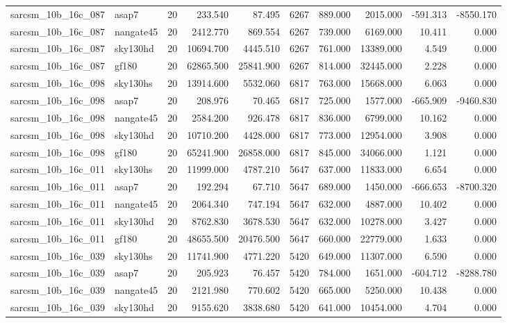 \begin{tabular}{llrrrrrrrr}
sarcsm\_10b\_16c\_087 & asap7 & 20 & 233.540 & 87.495 & 6267 & 889.000 & 2015.000 & -591.313 & -8550.170 \\
sarcsm\_10b\_16c\_087 & nangate45 & 20 & 2412.770 & 869.554 & 6267 & 739.000 & 6169.000 & 10.411 & 0.000 \\
sarcsm\_10b\_16c\_087 & sky130hd & 20 & 10694.700 & 4445.510 & 6267 & 761.000 & 13389.000 & 4.549 & 0.000 \\
sarcsm\_10b\_16c\_087 & gf180 & 20 & 62865.500 & 25841.900 & 6267 & 814.000 & 32445.000 & 2.228 & 0.000 \\
sarcsm\_10b\_16c\_098 & sky130hs & 20 & 13914.600 & 5532.060 & 6817 & 763.000 & 15668.000 & 6.063 & 0.000 \\
sarcsm\_10b\_16c\_098 & asap7 & 20 & 208.976 & 70.465 & 6817 & 725.000 & 1577.000 & -665.909 & -9460.830 \\
sarcsm\_10b\_16c\_098 & nangate45 & 20 & 2584.200 & 926.478 & 6817 & 836.000 & 6799.000 & 10.162 & 0.000 \\
sarcsm\_10b\_16c\_098 & sky130hd & 20 & 10710.200 & 4428.000 & 6817 & 773.000 & 12954.000 & 3.908 & 0.000 \\
sarcsm\_10b\_16c\_098 & gf180 & 20 & 65241.900 & 26858.000 & 6817 & 845.000 & 34066.000 & 1.121 & 0.000 \\
sarcsm\_10b\_16c\_011 & sky130hs & 20 & 11999.000 & 4787.210 & 5647 & 637.000 & 11833.000 & 6.654 & 0.000 \\
sarcsm\_10b\_16c\_011 & asap7 & 20 & 192.294 & 67.710 & 5647 & 689.000 & 1450.000 & -666.653 & -8700.320 \\
sarcsm\_10b\_16c\_011 & nangate45 & 20 & 2064.340 & 747.194 & 5647 & 632.000 & 4887.000 & 10.402 & 0.000 \\
sarcsm\_10b\_16c\_011 & sky130hd & 20 & 8762.830 & 3678.530 & 5647 & 632.000 & 10278.000 & 3.427 & 0.000 \\
sarcsm\_10b\_16c\_011 & gf180 & 20 & 48655.500 & 20476.500 & 5647 & 660.000 & 22779.000 & 1.633 & 0.000 \\
sarcsm\_10b\_16c\_039 & sky130hs & 20 & 11741.900 & 4771.220 & 5420 & 649.000 & 11307.000 & 6.590 & 0.000 \\
sarcsm\_10b\_16c\_039 & asap7 & 20 & 205.923 & 76.457 & 5420 & 784.000 & 1651.000 & -604.712 & -8288.780 \\
sarcsm\_10b\_16c\_039 & nangate45 & 20 & 2121.980 & 770.602 & 5420 & 665.000 & 5250.000 & 10.438 & 0.000 \\
sarcsm\_10b\_16c\_039 & sky130hd & 20 & 9155.620 & 3838.680 & 5420 & 641.000 & 10454.000 & 4.704 & 0.000 \\

\end{tabular}
